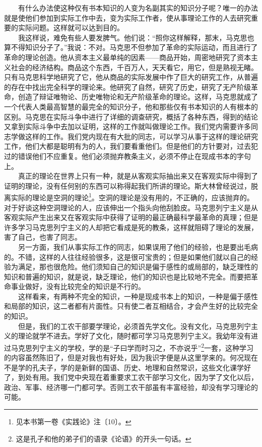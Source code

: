 \documentclass[cn,11pt,chinese]{elegantbook}
\begin{document}
　　有什么办法使这种仅有书本知识的人变为名副其实的知识分子呢？唯一的办法就是使他们参加到实际工作中去，变为实际工作者，使从事理论工作的人去研究重要的实际问题。这样就可以达到目的。\\
　　我这样说，难免有些人要发脾气。他们说：“照你这样解释，那末，马克思也算不得知识分子了。”我说：不对。马克思不但参加了革命的实际运动，而且进行了革命的理论创造。他从资本主义最单纯的因素——商品开始，周密地研究了资本主义社会的经济结构。商品这个东西，千百万人，天天看它，用它，但是熟视无睹。只有马克思科学地研究了它，他从商品的实际发展中作了巨大的研究工作，从普遍的存在中找出完全科学的理论来。他研究了自然，研究了历史，研究了无产阶级革命，创造了辩证唯物论、历史唯物论和无产阶级革命的理论。这样，马克思就成了一个代表人类最高智慧的最完全的知识分子，他和那些仅有书本知识的人有根本的区别。马克思在实际斗争中进行了详细的调查研究，概括了各种东西，得到的结论又拿到实际斗争中去加以证明，这样的工作就叫做理论工作。我们党内需要许多同志学做这样的工作。我们党内现在有大批的同志，可以学习从事于这样的理论研究工作，他们大都是聪明有为的人，我们要看重他们。但是他们的方针要对，过去犯过的错误他们不应重复。他们必须抛弃教条主义，必须不停止在现成书本的字句上。\\
　　真正的理论在世界上只有一种，就是从客观实际抽出来又在客观实际中得到了证明的理论，没有任何别的东西可以称得起我们所讲的理论。斯大林曾经说过，脱离实际的理论是空洞的理论\footnote[4]{ 见本书第一卷《实践论》注〔10〕。}。空洞的理论是没有用的，不正确的，应该抛弃的。对于好谈这种空洞理论的人，应该伸出一个指头向他刮脸皮。马克思列宁主义是从客观实际产生出来又在客观实际中获得了证明的最正确最科学最革命的真理；但是许多学习马克思列宁主义的人却把它看成是死的教条，这样就阻碍了理论的发展，害了自己，也害了同志。\\
　　另一方面，我们从事实际工作的同志，如果误用了他们的经验，也是要出毛病的。不错，这样的人往往经验很多，这是很可宝贵的；但是如果他们就以自己的经验为满足，那也很危险。他们须知自己的知识是偏于感性的或局部的，缺乏理性的知识和普遍的知识，就是说，缺乏理论，他们的知识也是比较地不完全。而要把革命事业做好，没有比较完全的知识是不行的。\\
　　这样看来，有两种不完全的知识，一种是现成书本上的知识，一种是偏于感性和局部的知识，这二者都有片面性。只有使二者互相结合，才会产生好的比较完全的知识。\\
　　但是，我们的工农干部要学理论，必须首先学文化。没有文化，马克思列宁主义的理论就学不进去。学好了文化，随时都可学习马克思列宁主义。我幼年没有进过马克思列宁主义的学校，学的是“子曰学而时习之，不亦说乎”\footnote[5]{ 这是孔子和他的弟子们的语录《论语》的开头一句话。}一套，这种学习的内容虽然陈旧了，但是对我也有好处，因为我识字便是从这里学来的。何况现在不是学的孔夫子，学的是新鲜的国语、历史、地理和自然常识，这些文化课学好了，到处有用。我们党中央现在着重要求工农干部学习文化，因为学了文化以后，政治、军事、经济哪一门都可学。否则工农干部虽有丰富经验，却没有学习理论的可能。\\
\end{document}
